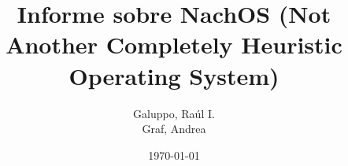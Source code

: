 \documentclass[a4paper,11pt,twoside, openright]{utthesis} %
\title{Informe sobre NachOS (Not Another Completely Heuristic Operating System)}
\author{Galuppo, Raúl I. \\Graf, Andrea}
\date{\today}
\begin{document}
\maketitle
\newpage


\renewcommand{\contentsname}{Contenidos}
\tableofcontents %







%

\end{document}
